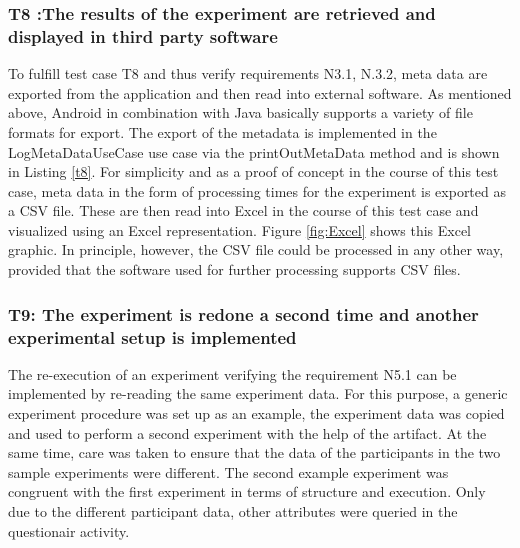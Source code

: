 \subsubsection*{T8 :The results of the experiment are retrieved and displayed in third party software}

To fulfill test case T8 and thus verify requirements N3.1, N.3.2, meta data are exported from the application and then read into external software. As mentioned above, Android in combination with Java basically supports a variety of file formats for export. The export of the metadata is implemented in the LogMetaDataUseCase use case via the printOutMetaData method and is shown in Listing \ref{t8}. For simplicity and as a proof of concept in the course of this test case, meta data in the form of processing times for the experiment is exported as a CSV file. These are then read into Excel in the course of this test case and visualized using an Excel representation. Figure \ref{fig:Excel} shows this Excel graphic. In principle, however, the CSV file could be processed in any other way, provided that the software used for further processing supports CSV files. 

\subsubsection*{T9: The experiment is redone a second time and another experimental setup is implemented}

The re-execution of an experiment verifying the requirement N5.1 can be implemented by re-reading the same experiment data. For this purpose, a generic experiment procedure was set up as an example, the experiment data was copied and used to perform a second experiment with the help of the artifact. At the same time, care was taken to ensure that the data of the participants in the two sample experiments were different. The second example experiment was congruent with the first experiment in terms of structure and execution. Only due to the different participant data, other attributes were queried in the questionair activity.




